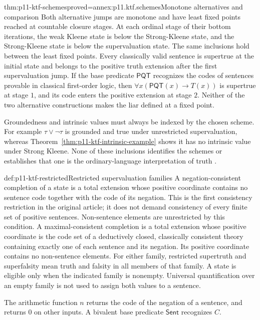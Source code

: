 \begin{hbtheorem}{thm:p11-ktf-schemes}{proved=annex:p11.ktf.schemes}{Monotone alternatives and comparison}
Both alternative jumps are monotone and have least fixed points reached
at countable closure stages. At each ordinal stage of their bottom
iterations, the weak Kleene state is below the Strong-Kleene state,
and the Strong-Kleene state is below the supervaluation state.
The same inclusions hold between the least fixed points.
Every classically valid sentence is supertrue at the initial state and
belongs to the positive truth extension after the first supervaluation
jump. If the base predicate \(\mathsf{PQT}\) recognizes the codes of
sentences provable in classical first-order logic, then
\(\forall x(\mathsf{PQT}(x)\to T(x))\) is supertrue at stage
\(1\), and its code enters the positive extension at stage \(2\).
Neither of the two alternative constructions makes the liar defined
at a fixed point.
\end{hbtheorem}

Groundedness and intrinsic values must always be indexed by the chosen
scheme. For example \(\tau\lor\neg\tau\) is grounded and true
under unrestricted supervaluation, whereas
Theorem~\ref{thm:p11-ktf-intrinsic-example} shows it has no intrinsic
value under Strong Kleene. None of these inclusions identifies the
schemes or establishes that one is the ordinary-language interpretation
of truth \cite[pp.~711--712]{Kripke1975}.

\begin{hbdefinition}{def:p11-ktf-restricted}{Restricted supervaluation families}
A negation-consistent completion of a state is a total extension whose
positive coordinate contains no sentence code together with the code of
its negation. This is the first consistency restriction in the original
article; it does not demand consistency of every finite set of positive
sentences. Non-sentence elements are unrestricted by this condition.
A maximal-consistent completion is a total extension whose positive
coordinate is the code set of a deductively closed, classically consistent
theory containing exactly one of each sentence and its negation.
Its positive coordinate contains no non-sentence elements. For either family,
restricted supertruth and superfalsity mean truth and falsity in all
members of that family. A state is eligible only when the indicated
family is nonempty. Universal quantification over an empty family is not
used to assign both values to a sentence.

The arithmetic function \(n\) returns the code of the negation of a
sentence, and returns \(0\) on other inputs. A bivalent base predicate
\(\mathsf{Sent}\) recognizes \(C\).
\end{hbdefinition}

